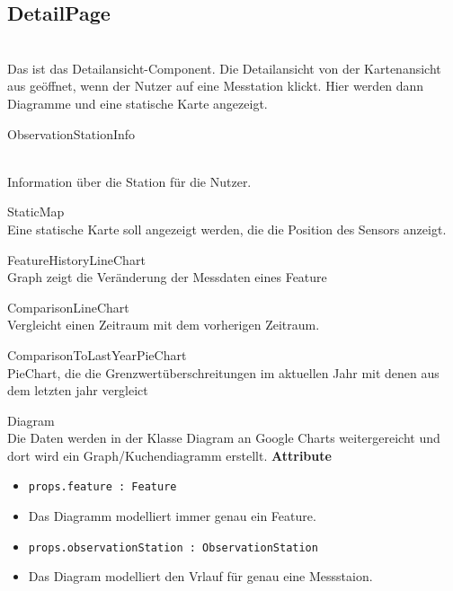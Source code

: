 \subsection{DetailPage}
\\Das ist das Detailansicht-Component. Die Detailansicht von der Kartenansicht aus geöffnet, wenn der Nutzer auf eine Messtation klickt. Hier werden dann Diagramme und eine statische Karte angezeigt.
   
    \begin{Class}{ObservationStationInfo}
      
            \\ Information über die Station für die Nutzer.
    \end{Class}

    \begin{Class}{StaticMap}
            \\Eine statische Karte soll angezeigt werden, die die Position des Sensors anzeigt.
    \end{Class}

  
    \begin{Class}{FeatureHistoryLineChart}
           \\ Graph zeigt die Veränderung der Messdaten eines Feature
    \end{Class}

    \begin{Class}{ComparisonLineChart}
            \\Vergleicht einen Zeitraum mit dem vorherigen Zeitraum.
    \end{Class}

    \begin{Class}{ComparisonToLastYearPieChart}
            \\ PieChart, die die Grenzwertüberschreitungen im aktuellen Jahr mit denen aus dem letzten jahr vergleict 
    \end{Class}

    \begin{Class}{Diagram}
        \\Die Daten werden in der Klasse Diagram an Google Charts weitergereicht und dort wird ein Graph/Kuchendiagramm erstellt.
        \textbf{Attribute}
        \begin{itemize}
            \item \texttt{props.feature : Feature}
            \item Das Diagramm modelliert immer genau ein Feature.
            \item \texttt{props.observationStation : ObservationStation}
            \item Das Diagram modelliert den Vrlauf für genau eine Messstaion.

        \end{itemize}
    \end{Class}

